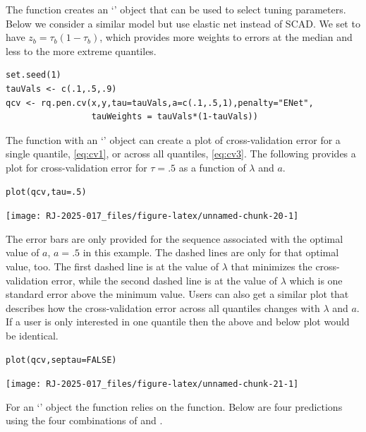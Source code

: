 The function  creates an `' object that can be used to select tuning parameters. Below we consider a similar model but use elastic net instead of SCAD. We set  to have \(z_b=\tau_b(1-\tau_b)\), which provides more weights to errors at the median and less to the more extreme quantiles.

\begin{verbatim}
set.seed(1)
tauVals <- c(.1,.5,.9)
qcv <- rq.pen.cv(x,y,tau=tauVals,a=c(.1,.5,1),penalty="ENet",
                 tauWeights = tauVals*(1-tauVals))
\end{verbatim}

The  function with an `' object can create a plot of cross-validation error for a single quantile, \eqref{eq:cv1}, or across all quantiles, \eqref{eq:cv3}. The following provides a plot for cross-validation error for \(\tau=.5\) as a function of \(\lambda\) and \(a\).

\begin{verbatim}
plot(qcv,tau=.5)
\end{verbatim}

\begin{center}\texttt{[image: RJ-2025-017\_files/figure-latex/unnamed-chunk-20-1]} \end{center}

The error bars are only provided for the sequence associated with the optimal value of \(a\), \(a=.5\) in this example. The dashed lines are only for that optimal value, too. The first dashed line is at the value of \(\lambda\) that minimizes the cross-validation error, while the second dashed line is at the value of \(\lambda\) which is one standard error above the minimum value. Users can also get a similar plot that describes how the cross-validation error across all quantiles changes with \(\lambda\) and \(a\). If a user is only interested in one quantile then the above and below plot would be identical.

\begin{verbatim}
plot(qcv,septau=FALSE)
\end{verbatim}

\begin{center}\texttt{[image: RJ-2025-017\_files/figure-latex/unnamed-chunk-21-1]} \end{center}

For an `' object the  function relies on the  function. Below are four predictions using the four combinations of  and .

